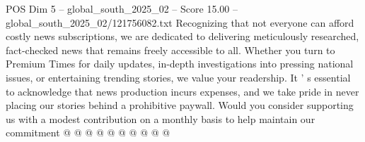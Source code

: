 \begin{textsample}{POS Dim 5 – global\_south\_2025\_02 – Score 15.00 – global\_south\_2025\_02/121756082.txt}
Recognizing that not everyone can afford costly news subscriptions, we are dedicated to delivering meticulously researched, fact-checked news that remains freely accessible to all.
Whether you turn to Premium Times for daily updates, in-depth investigations into pressing national issues, or entertaining trending stories, we value your readership.
It ' s essential to acknowledge that news production incurs expenses, and we take pride in never placing our stories behind a prohibitive paywall.
Would you consider supporting us with a modest contribution on a monthly basis to help maintain our commitment @ @ @ @ @ @ @ @ @ @

\end{textsample}
